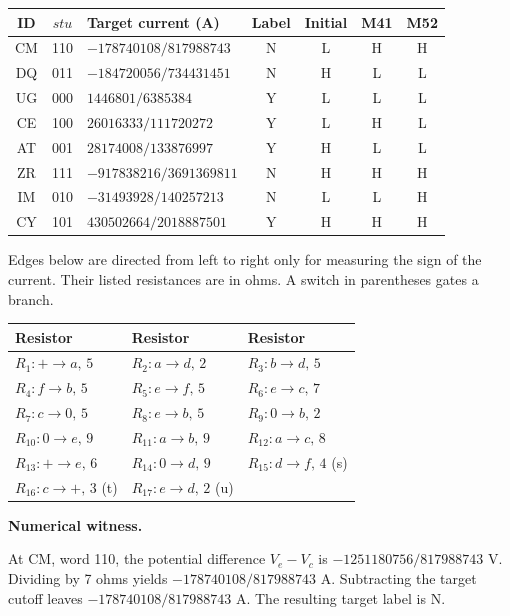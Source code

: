 \documentclass[12pt,letterpaper]{article}
\newcommand{\reading}[2]{\par\smallskip\textsf{\color{accent}\bfseries #1}\enspace #2\par}
\begin{document}
\begin{center}{\small\setlength{\tabcolsep}{4pt}\begin{tabularx}{\linewidth}{@{}ccYcccc@{}}\toprule
ID & $stu$ & Target current (A) & Label & Initial & M41 & M52\\\midrule
CM & 110 & $-178740108/817988743$ & N & L & H & H\\
DQ & 011 & $-184720056/734431451$ & N & H & L & L\\
UG & 000 & $1446801/6385384$ & Y & L & L & L\\
CE & 100 & $26016333/111720272$ & Y & L & H & L\\
AT & 001 & $28174008/133876997$ & Y & H & L & L\\
ZR & 111 & $-917838216/3691369811$ & N & H & H & H\\
IM & 010 & $-31493928/140257213$ & N & L & L & H\\
CY & 101 & $430502664/2018887501$ & Y & H & H & H\\
\bottomrule\end{tabularx}}\end{center}

Edges below are directed from left to right only for measuring the sign of the current. Their listed resistances are in ohms. A switch in parentheses gates a branch.

\begin{center}{\footnotesize\setlength{\tabcolsep}{4pt}\begin{tabularx}{\linewidth}{@{}YYY@{}}\toprule
Resistor & Resistor & Resistor\\\midrule
$R_{1}: +\!\to\!a,\,5$ & $R_{2}: a\!\to\!d,\,2$ & $R_{3}: b\!\to\!d,\,5$\\
$R_{4}: f\!\to\!b,\,5$ & $R_{5}: e\!\to\!f,\,5$ & $R_{6}: e\!\to\!c,\,7$\\
$R_{7}: c\!\to\!0,\,5$ & $R_{8}: e\!\to\!b,\,5$ & $R_{9}: 0\!\to\!b,\,2$\\
$R_{10}: 0\!\to\!e,\,9$ & $R_{11}: a\!\to\!b,\,9$ & $R_{12}: a\!\to\!c,\,8$\\
$R_{13}: +\!\to\!e,\,6$ & $R_{14}: 0\!\to\!d,\,9$ & $R_{15}: d\!\to\!f,\,4$ (s)\\
$R_{16}: c\!\to\!+,\,3$ (t) & $R_{17}: e\!\to\!d,\,2$ (u) & \\
\bottomrule\end{tabularx}}\end{center}

\reading{Numerical witness.}{} At CM, word 110, the potential difference $V_{e}-V_{c}$ is $-1251180756/817988743$ V. Dividing by 7 ohms yields $-178740108/817988743$ A. Subtracting the target cutoff leaves $-178740108/817988743$ A. The resulting target label is N.
\end{document}
